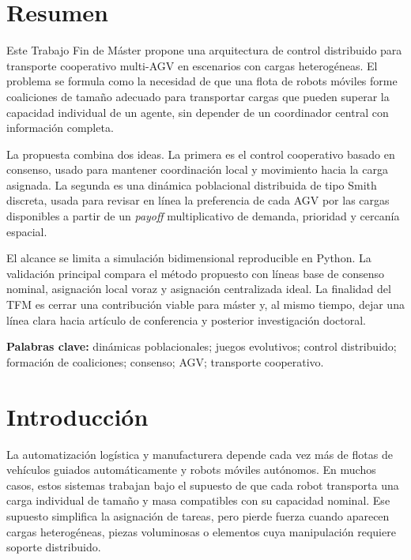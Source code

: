 \documentclass[11pt,a4paper]{article}
\begin{document}
\hypersetup{pageanchor=false}
\makeviucover
\hypersetup{pageanchor=true}

\tableofcontents
\clearpage
{}

\section*{Resumen}

Este Trabajo Fin de Máster propone una arquitectura de control distribuido para transporte cooperativo multi-AGV en escenarios con cargas heterogéneas. El problema se formula como la necesidad de que una flota de robots móviles forme coaliciones de tamaño adecuado para transportar cargas que pueden superar la capacidad individual de un agente, sin depender de un coordinador central con información completa.

La propuesta combina dos ideas. La primera es el control cooperativo basado en consenso, usado para mantener coordinación local y movimiento hacia la carga asignada. La segunda es una dinámica poblacional distribuida de tipo Smith discreta, usada para revisar en línea la preferencia de cada AGV por las cargas disponibles a partir de un \textit{payoff} multiplicativo de demanda, prioridad y cercanía espacial.

El alcance se limita a simulación bidimensional reproducible en Python. La validación principal compara el método propuesto con líneas base de consenso nominal, asignación local voraz y asignación centralizada ideal. La finalidad del TFM es cerrar una contribución viable para máster y, al mismo tiempo, dejar una línea clara hacia artículo de conferencia y posterior investigación doctoral.

\textbf{Palabras clave:} dinámicas poblacionales; juegos evolutivos; control distribuido; formación de coaliciones; consenso; AGV; transporte cooperativo.

\section{Introducción}

La automatización logística y manufacturera depende cada vez más de flotas de vehículos guiados automáticamente y robots móviles autónomos. En muchos casos, estos sistemas trabajan bajo el supuesto de que cada robot transporta una carga individual de tamaño y masa compatibles con su capacidad nominal. Ese supuesto simplifica la asignación de tareas, pero pierde fuerza cuando aparecen cargas heterogéneas, piezas voluminosas o elementos cuya manipulación requiere soporte distribuido.
\end{document}
